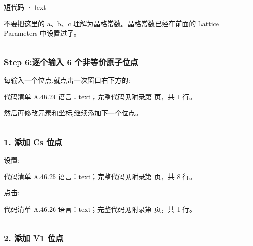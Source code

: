 \documentclass[lang=cn,scheme=chinese,color=blue,device=normal,toc=onecol,math=cm]{elegantbook}
\begin{document}
\begin{inlinecodebox}{短代码 · text}
\end{inlinecodebox}


不要把这里的 a、b、c 理解为晶格常数。晶格常数已经在前面的 Lattice Parameters 中设置过了。\par


\medskip\hrule\medskip


\subsubsection{Step 6:逐个输入 6 个非等价原子位点}


每输入一个位点,就点击一次窗口右下方的:\par


\begin{codeindexbox}{代码清单 A.46.24}
语言：text；完整代码见附录第 \pageref{code:46:24} 页，共 1 行。
\end{codeindexbox}


然后再修改元素和坐标,继续添加下一个位点。\par


\medskip\hrule\medskip


\subsubsection{1. 添加 Cs 位点}


设置:\par


\begin{codeindexbox}{代码清单 A.46.25}
语言：text；完整代码见附录第 \pageref{code:46:25} 页，共 8 行。
\end{codeindexbox}


点击:\par


\begin{codeindexbox}{代码清单 A.46.26}
语言：text；完整代码见附录第 \pageref{code:46:26} 页，共 1 行。
\end{codeindexbox}


\medskip\hrule\medskip


\subsubsection{2. 添加 V1 位点}
\end{document}
